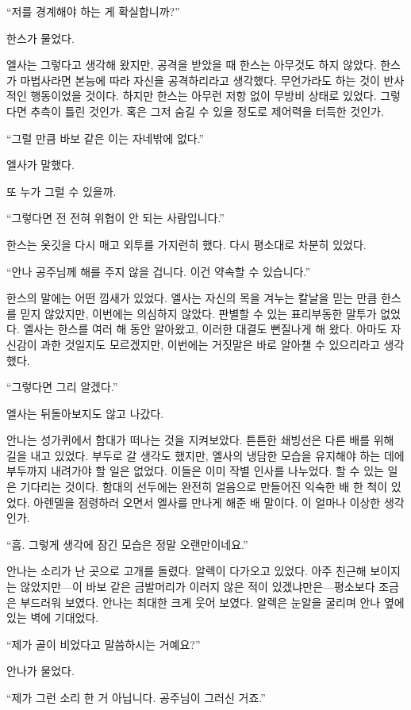 ``저를 경계해야 하는 게 확실합니까?''

한스가 물었다.

엘사는 그렇다고 생각해 왔지만, 공격을 받았을 때 한스는 아무것도 하지 않았다. 한스가 마법사라면 본능에 따라 자신을 공격하리라고 생각했다. 무언가라도 하는 것이 반사적인 행동이었을 것이다. 하지만 한스는 아무런 저항 없이 무방비 상태로 있었다. 그렇다면 추측이 틀린 것인가. 혹은 그저 숨길 수 있을 정도로 제어력을 터득한 것인가.

``그럴 만큼 바보 같은 이는 자네밖에 없다.''

엘사가 말했다.

또 누가 그럴 수 있을까.

``그렇다면 전 전혀 위협이 안 되는 사람입니다.''

한스는 옷깃을 다시 매고 외투를 가지런히 했다. 다시 평소대로 차분히 있었다.

``안나 공주님께 해를 주지 않을 겁니다. 이건 약속할 수 있습니다.''

한스의 말에는 어떤 낌새가 있었다. 엘사는 자신의 목을 겨누는 칼날을 믿는 만큼 한스를 믿지 않았지만, 이번에는 의심하지 않았다. 판별할 수 있는 표리부동한 말투가 없었다. 엘사는 한스를 여러 해 동안 알아왔고, 이러한 대결도 뻔질나게 해 왔다. 아마도 자신감이 과한 것일지도 모르겠지만, 이번에는 거짓말은 바로 알아챌 수 있으리라고 생각했다.

``그렇다면 그리 알겠다.''

엘사는 뒤돌아보지도 않고 나갔다.

\textbreak

안나는 성가퀴에서 함대가 떠나는 것을 지켜보았다. 튼튼한 쇄빙선은 다른 배를 위해 길을 내고 있었다. 부두로 갈 생각도 했지만, 엘사의 냉담한 모습을 유지해야 하는 데에 부두까지 내려가야 할 일은 없었다. 이들은 이미 작별 인사를 나누었다. 할 수 있는 일은 기다리는 것이다. 함대의 선두에는 완전히 얼음으로 만들어진 익숙한 배 한 척이 있었다. 아렌델을 점령하러 오면서 엘사를 만나게 해준 배 말이다. 이 얼마나 이상한 생각인가.

``흠. 그렇게 생각에 잠긴 모습은 정말 오랜만이네요.''

안나는 소리가 난 곳으로 고개를 돌렸다. 알렉이 다가오고 있었다. 아주 친근해 보이지는 않았지만—이 바보 같은 금발머리가 이러지 않은 적이 있겠냐만은—평소보다 조금은 부드러워 보였다. 안나는 최대한 크게 웃어 보였다. 알렉은 눈알을 굴리며 안나 옆에 있는 벽에 기대었다.

``제가 골이 비었다고 말씀하시는 거예요?''

안나가 물었다.

``제가 그런 소리 한 거 아닙니다. 공주님이 그러신 거죠.''

